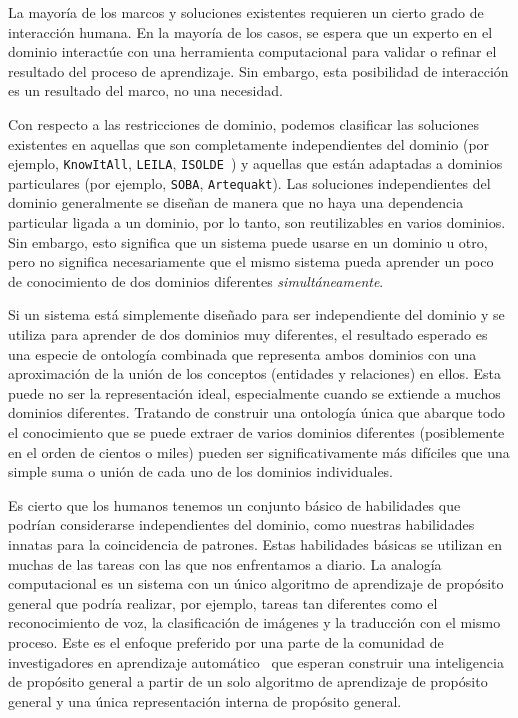 La mayoría de los marcos y soluciones existentes requieren un cierto grado de interacción humana. En la mayoría de los casos, se espera que un experto en el dominio interactúe con una herramienta computacional para validar o refinar el resultado del proceso de aprendizaje.
Sin embargo, esta posibilidad de interacción es un resultado del marco, no una necesidad.

Con respecto a las restricciones de dominio, podemos clasificar las soluciones existentes en aquellas que son completamente independientes del dominio (por ejemplo, \texttt{KnowItAll}, \texttt{LEILA}, \texttt{ISOLDE}~\cite{isolde}) y aquellas que están adaptadas a dominios particulares (por ejemplo, \texttt{SOBA}, \texttt{Artequakt}).
Las soluciones independientes del dominio generalmente se diseñan de manera que no haya una dependencia particular ligada a un dominio, por lo tanto, son reutilizables en varios dominios.
Sin embargo, esto significa que un sistema puede usarse en un dominio u otro, pero no significa necesariamente que el mismo sistema pueda aprender un poco de conocimiento de dos dominios diferentes \emph{simultáneamente}.

Si un sistema está simplemente diseñado para ser independiente del dominio y se utiliza para aprender de dos dominios muy diferentes, el resultado esperado es una especie de ontología combinada que representa ambos dominios con una aproximación de la unión de los conceptos (entidades y relaciones) en ellos.
Esta puede no ser la representación ideal, especialmente cuando se extiende a muchos dominios diferentes.
Tratando de construir una ontología única que abarque todo el conocimiento que se puede extraer de varios dominios diferentes (posiblemente en el orden de cientos o miles) pueden ser significativamente más difíciles que una simple suma o unión de cada uno de los dominios individuales.

Es cierto que los humanos tenemos un conjunto básico de habilidades que podrían considerarse independientes del dominio, como nuestras habilidades innatas para la coincidencia de patrones.
Estas habilidades básicas se utilizan en muchas de las tareas con las que nos enfrentamos a diario.
La analogía computacional es un sistema con un único algoritmo de aprendizaje de propósito general que podría realizar, por ejemplo, tareas tan diferentes como el reconocimiento de voz, la clasificación de imágenes y la traducción con el mismo proceso.
Este es el enfoque preferido por una parte de la comunidad de investigadores en aprendizaje automático~\cite{kaiser2017one} que esperan construir una inteligencia de propósito general a partir de un solo algoritmo de aprendizaje de propósito general y una única representación interna de propósito general.

